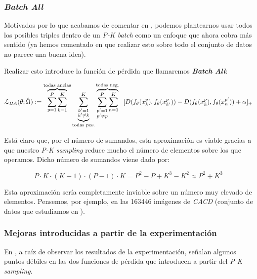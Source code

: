 \subsubsection{\textit{Batch All}} \label{isubsubs:batch_all}

Motivados por lo que acabamos de comentar en , podemos plantearnos usar todos los posibles triples dentro de un \textit{P-K batch} como un enfoque que ahora cobra más sentido (ya hemos comentado en  que realizar esto sobre todo el conjunto de datos no parece una buena idea).

Realizar esto introduce la función de pérdida que llamaremos \textbf{\textit{Batch All}}:

\begin{equation} \label{ieq:batch_all}
    \mathcal{L}_{BA}(\theta; \hat{\Omega}) :=
    \overbrace{\sum_{p = 1}^{P} \sum_{k = 1}^K}^\textrm{\text{todas anclas}}
    \underbrace{\sum_{\substack{k' = 1 \\ k' \neq k}}^{K}}_\textrm{\text{todas pos.}}
    \overbrace{\sum_{\substack{p' = 1 \\ p' \neq p}}^P \sum_{n = 1}^K}^\textrm{\text{todas neg.}} \ \ [
        D(f_{\theta}(x_k^p),f_{\theta}(x_{k'}^p)) - D(f_{\theta}(x_k^p),f_{\theta}(x_{n}^{p'})) + \alpha
    ]_+
\end{equation}

Está claro que, por el número de sumandos, esta aproximación es viable gracias a que nuestro \textit{P-K sampling} reduce mucho el número de elementos sobre los que operamos. Dicho número de sumandos viene dado por:

\begin{equation}
    P \cdot K \cdot (K - 1) \cdot (P - 1) \cdot K = P^2 - P + K^3 - K^2 \approx P^2 + K^3
\end{equation}

Esta aproximación sería completamente inviable sobre un número muy elevado de elementos. Pensemos, por ejemplo, en las 163446 imágenes de \textit{CACD} (conjunto de datos que estudiamos en ).

\subsubsection{Mejoras introducidas a partir de la experimentación} \label{isubsubs:mejoras_sumandos_no_nulos}

En \cite{informatica:principal}, a raíz de observar los resultados de la experimentación, señalan algunos puntos débiles en las dos funciones de pérdida que introducen a partir del \textit{P-K sampling}.

